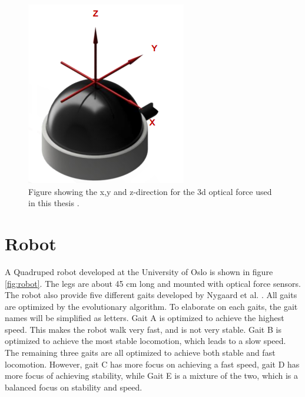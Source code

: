 \documentclass[USenglish]{ifimaster}  %
\begin{document}
\begin{figure}[h]
	\centering
	\includegraphics[scale=0.8]{Figures/OptoforceAxis3}
	\caption{Figure showing the x,y and z-direction for the 3d optical force used in this thesis \cite{OptoforceSheet}.}
	\label{fig:OptoforceAxis}
\end{figure}

\section{Robot} \label{sec:robot}
A Quadruped robot developed at the University of Oslo is shown in figure \ref{fig:robot}. The legs are about 45 cm long and mounted with optical force sensors. The robot also provide five different gaits developed by Nygaard et al. \cite{7850167}. All gaits are optimized by the evolutionary algorithm. To elaborate on each gaits, the gait names will be simplified as letters. Gait A is optimized to achieve the highest speed. This makes the robot walk very fast, and is not very stable. Gait B is optimized to achieve the most stable locomotion, which leads to a slow speed. The remaining three gaits are all optimized to achieve both stable and fast locomotion. However, gait C has more focus on achieving a fast speed, gait D has more focus of achieving stability, while Gait E is a mixture of the two, which is a balanced focus on stability and speed.
\end{document}
